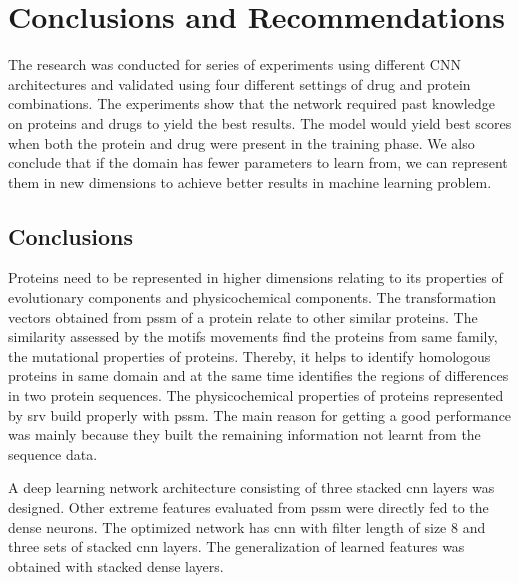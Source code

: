 \chapter{Conclusions and Recommendations}

The research was conducted for series of experiments using different CNN architectures and validated using four different settings of drug and protein combinations. The experiments show that the network required past knowledge on proteins and drugs to yield the best results. The model would yield best scores when both the protein and drug were present in the training phase. We also conclude that if the domain has fewer parameters to learn from, we can represent them in new dimensions to achieve better results in machine learning problem.

\section{Conclusions}
    Proteins need to be represented in higher dimensions relating to its properties of evolutionary components and physicochemical components. The transformation vectors obtained from \acrfull{pssm} of a protein relate to other similar proteins. The similarity assessed by the motifs movements find the proteins from same family, the mutational properties of proteins. Thereby, it helps to identify homologous proteins in same domain and at the same time identifies the regions of differences in two protein sequences. The physicochemical properties of proteins represented by \acrfull{srv} build properly with \acrshort{pssm}. The main reason for getting a good performance was mainly because they built the remaining information not learnt from the sequence data.

    A deep learning network architecture consisting of three stacked \acrfull{cnn} layers was designed. Other extreme features evaluated from \acrshort{pssm} were directly fed to the dense neurons. The optimized network has \acrshort{cnn} with filter length of size 8 and three sets of stacked \acrshort{cnn} layers. The generalization of learned features was obtained with stacked dense layers.

